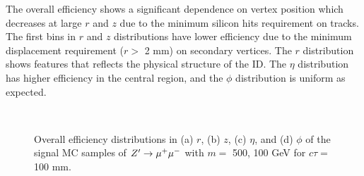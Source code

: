 The overall efficiency shows a significant dependence on vertex position which decreases at large $r$ and $z$ due to the minimum silicon hits requirement on tracks. The first bins in $r$ and $z$ distributions have lower efficiency due to the minimum displacement requirement ($r > $ 2 mm) on secondary vertices. The $r$ distribution shows features that reflects the physical structure of the ID. The $\eta$ distribution has higher efficiency in the central region, and the $\phi$ distribution is uniform as expected.


\begin{figure}[!htb]
    \centering
     \\
    \caption{Overall efficiency distributions in (a) $r$, (b) $z$, (c) $\eta$, and (d) $\phi$ of the signal MC samples of $Z'\rightarrow \mu^{+}\mu^{-}$ with $m=$ 500, 100 GeV for $c\tau=$ 100 mm.}
    \label{fig:signal_vertex_dist}
\end{figure}
